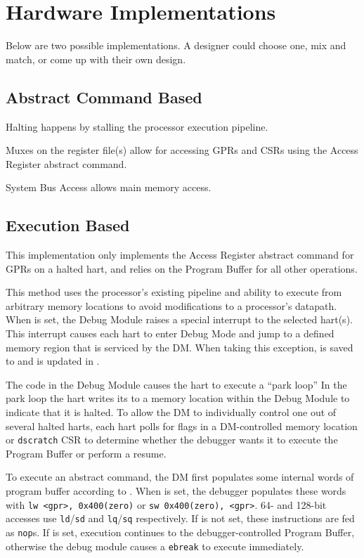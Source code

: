 \chapter{Hardware Implementations}
\label{sec:implementations}

Below are two possible implementations. A designer could choose one, mix and
match, or come up with their own design.

\section{Abstract Command Based}

Halting happens by stalling the processor execution pipeline.

Muxes on the register file(s) allow for accessing GPRs and CSRs
using the Access Register abstract command.

System Bus Access allows main memory access.

\section{Execution Based}

This implementation only implements the Access Register abstract command
for GPRs on a halted hart, and relies on the Program Buffer for all other
operations.

This method uses the processor's existing pipeline
and ability to execute from arbitrary memory locations to avoid
modifications to a processor's datapath.
When \Fhaltreq is set, the Debug Module raises a special interrupt
to the selected hart(s). This interrupt causes each
hart to enter Debug Mode and jump to a defined
memory region that is serviced by the DM.
When taking this exception, \Rpc is saved to \Rdpc and \Fcause is updated
in \Rdcsr.

The code in the Debug Module causes the hart to execute a ``park loop''
In the park loop the hart writes its \Rmhartid to a
memory location within the Debug
Module to indicate that it is halted.
To allow the DM to individually control one out of several
halted harts, each hart polls for flags in a DM-controlled memory location or
{\tt dscratch} CSR to determine whether the debugger wants it to
execute the Program Buffer or perform a resume.

To execute an abstract command, the DM first populates some internal words of
program buffer according to \Rcommand. When \Ftransfer is set, the debugger
populates these words with {\tt lw <gpr>, 0x400(zero)} or {\tt sw 0x400(zero), <gpr>}.
64- and 128-bit accesses use {\tt ld}/{\tt sd} and {\tt lq}/{\tt sq}
respectively. If \Ftransfer is not set, these instructions are fed as {\tt nop}s.
If \Fexecute is set, execution continues to the debugger-controlled Program Buffer,
otherwise the debug module causes a {\tt ebreak} to execute immediately.

